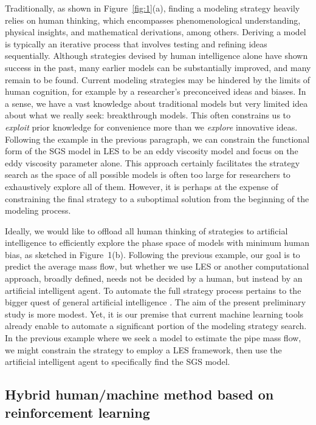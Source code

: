 \documentclass{article}
\begin{document}
Traditionally, as shown in Figure~\ref{fig:1}(a), finding a modeling
strategy heavily relies on human thinking, which encompasses
phenomenological understanding, physical insights, and mathematical
derivations, among others. Deriving a model is typically an iterative
process that involves testing and refining ideas
sequentially. Although strategies devised by human intelligence alone
have shown success in the past, many earlier models can be
substantially improved, and many remain to be found. Current modeling
strategies may be hindered by the limits of human cognition, for
example by a researcher's preconceived ideas and biases. In a sense,
we have a vast knowledge about traditional models but very limited
idea about what we really seek: breakthrough models. This often
constrains us to \emph{exploit} prior knowledge for convenience more
than we \emph{explore} innovative ideas. Following the example in the
previous paragraph, we can constrain the functional form of the SGS
model in LES to be an eddy viscosity model and focus on the eddy
viscosity parameter alone. This approach certainly facilitates the
strategy search as the space of all possible models is often too large
for researchers to exhaustively explore all of them. However, it is
perhaps at the expense of constraining the final strategy to a
suboptimal solution from the beginning of the modeling process.

Ideally, we would like to offload all human thinking of strategies to
artificial intelligence to efficiently explore the phase space of
models with minimum human bias, as sketched in Figure~1(b). Following
the previous example, our goal is to predict the average mass flow,
but whether we use LES or another computational approach, broadly defined, needs not be
decided by a human, but instead by an artificial intelligent agent. To
automate the full strategy process pertains to the bigger quest of
general artificial intelligence \citep{goertzel2007artificial}. The
aim of the present preliminary study is more modest. Yet, it is our
premise that current machine learning tools already enable to automate
a significant portion of the modeling strategy search. In the previous example
where we seek a model to estimate the pipe mass flow, we might constrain the strategy to employ a LES framework, then use the
artificial intelligent agent to specifically find the SGS model.

\subsection{Hybrid human/machine method based on reinforcement learning}
\end{document}

